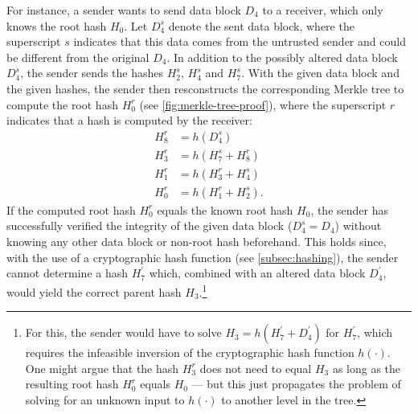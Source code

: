 		For instance, a sender wants to send data block $D_4$ to a receiver, which only knows the root hash $H_0$.
		Let $D_4^s$ denote the sent data block, where the superscript $s$ indicates that this data comes from the untrusted sender and could be different from the original $D_4$.
		In addition to the possibly altered data block $D_4^s$, the sender sends the hashes $H_2^s$, $H_4^s$ and $H_7^s$.
		With the given data block and the given hashes, the sender then resconstructs the corresponding Merkle tree to compute the root hash $H_0^r$ (see \autoref{fig:merkle-tree-proof}), where the superscript $r$ indicates that a hash is computed by the receiver:
		\begin{align}
			H_8^r &= h(D_4^s)\\
			H_3^r &= h(H_7^s + H_8^r)\\
			H_1^r &= h(H_3^r + H_4^s)\\
			H_0^r &= h(H_1^r + H_2^s).
		\end{align}
		If the computed root hash $H_0^r$ equals the known root hash $H_0$, the sender has successfully verified the integrity of the given data block ($D_4^s = D_4$) without knowing any other data block or non-root hash beforehand.
		This holds since, with the use of a cryptographic hash function (see \autoref{subsec:hashing}), the sender cannot determine a hash $H_7^\prime$ which, combined with an altered data block $D_4^\prime$, would yield the correct parent hash $H_3$.\footnote{For this, the sender would have to solve $H_3 = h(H_7^\prime + D_4^\prime)$ for $H_7^\prime$, which requires the infeasible inversion of the cryptographic hash function $h(\cdot)$.
		One might argue that the hash $H_3^r$ does not need to equal $H_3$ as long as the resulting root hash $H_0^r$ equals $H_0$ --- but this just propagates the problem of solving for an unknown input to $h(\cdot)$ to another level in the tree.}
